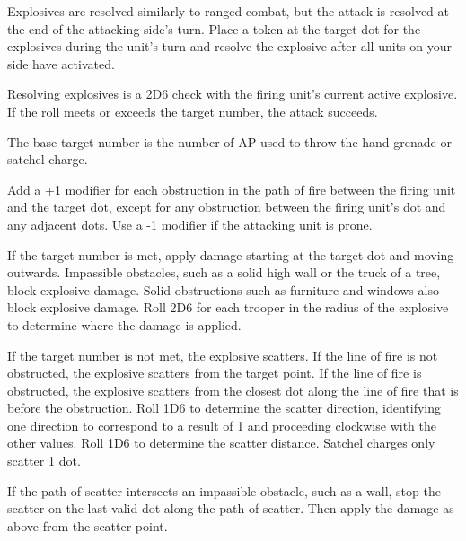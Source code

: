 Explosives are resolved similarly to ranged combat, but the attack is resolved at the end of the attacking side's turn.
Place a token at the target dot for the explosives during the unit's turn and resolve the explosive after all units on your side have activated.

Resolving explosives is a 2D6 check with the firing unit's current active explosive.
If the roll meets or exceeds the target number, the attack succeeds.

The base target number is the number of AP used to throw the hand grenade or satchel charge.

Add a +1 modifier for each obstruction in the path of fire between the firing unit and the target dot, except for any obstruction between the firing unit's dot and any adjacent dots.
Use a -1 modifier if the attacking unit is prone.

If the target number is met, apply damage starting at the target dot and moving outwards.
Impassible obstacles, such as a solid high wall or the truck of a tree, block explosive damage.
Solid obstructions such as furniture and windows also block explosive damage.
Roll 2D6 for each trooper in the radius of the explosive to determine where the damage is applied.

If the target number is not met, the explosive scatters.
If the line of fire is not obstructed, the explosive scatters from the target point.
If the line of fire is obstructed, the explosive scatters from the closest dot along the line of fire that is before the obstruction.
Roll 1D6 to determine the scatter direction, identifying one direction to correspond to a result of 1 and proceeding clockwise with the other values.
Roll 1D6 to determine the scatter distance.
Satchel charges only scatter 1 dot.

If the path of scatter intersects an impassible obstacle, such as a wall, stop the scatter on the last valid dot along the path of scatter.
Then apply the damage as above from the scatter point.
